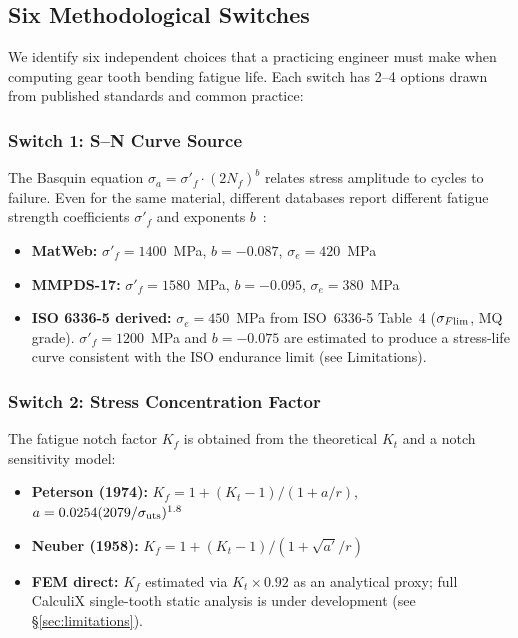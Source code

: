 \documentclass[12pt,a4paper]{article}
\begin{document}
\subsection{Six Methodological Switches}

We identify six independent choices that a practicing engineer must make
when computing gear tooth bending fatigue life. Each switch has 2--4
options drawn from published standards and common practice:

\subsubsection{Switch 1: S--N Curve Source}

The Basquin equation $\sigma_a = \sigma'_f \cdot (2N_f)^b$ relates stress
amplitude to cycles to failure. Even for the same material, different
databases report different fatigue strength coefficients
$\sigma'_f$ and exponents $b$~\cite{matweb, mmpds, iso6336_5}:

\begin{itemize}
  \item \textbf{MatWeb:} $\sigma'_f = 1400$~MPa, $b=-0.087$,
        $\sigma_e=420$~MPa
  \item \textbf{MMPDS-17:} $\sigma'_f = 1580$~MPa, $b=-0.095$,
        $\sigma_e=380$~MPa
  \item \textbf{ISO 6336-5 derived:} $\sigma_e=450$~MPa from ISO~6336-5
        Table~4 ($\sigma_{F\rm lim}$, MQ grade). $\sigma'_f=1200$~MPa and
        $b=-0.075$ are estimated to produce a stress-life curve consistent
        with the ISO endurance limit (see Limitations).
\end{itemize}

\subsubsection{Switch 2: Stress Concentration Factor}

The fatigue notch factor $K_f$ is obtained from the theoretical
$K_t$ and a notch sensitivity model:

\begin{itemize}
  \item \textbf{Peterson (1974):}
        $K_f = 1 + (K_t-1)/(1+a/r)$, $a=0.0254(2079/\sigma_{\rm uts})^{1.8}$
  \item \textbf{Neuber (1958):}
        $K_f = 1 + (K_t-1)/(1+\sqrt{a'}/r)$
  \item \textbf{FEM direct:} $K_f$ estimated via $K_t \times 0.92$ as an
        analytical proxy; full CalculiX single-tooth static analysis is
        under development (see \S\ref{sec:limitations}).
\end{itemize}
\end{document}
